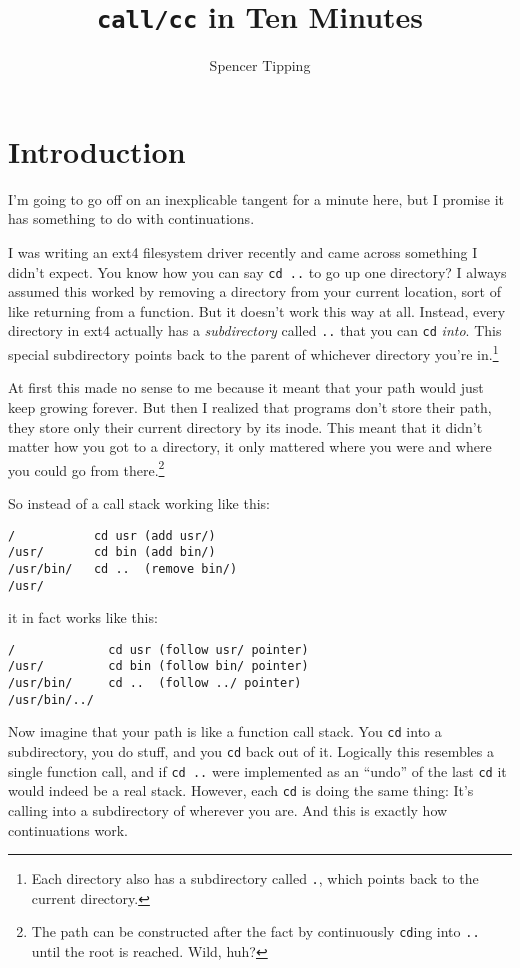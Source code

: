\documentclass{article}
\title{{\tt call/cc} in Ten Minutes}
\author{Spencer Tipping}
\begin{document}
\maketitle{}
\tableofcontents{}

\section{Introduction}
  I'm going to go off on an inexplicable tangent for a minute here, but I promise it has something to do with continuations.

  I was writing an ext4 filesystem driver recently and came across something I didn't expect. You know how you can say {\tt cd ..} to go up one directory? I always assumed this worked by
  removing a directory from your current location, sort of like returning from a function. But it doesn't work this way at all. Instead, every directory in ext4 actually has a {\em
  subdirectory} called {\tt ..} that you can {\tt cd} {\em into}. This special subdirectory points back to the parent of whichever directory you're in.\footnote{Each directory also has a
  subdirectory called {\tt .}, which points back to the current directory.}

  At first this made no sense to me because it meant that your path would just keep growing forever. But then I realized that programs don't store their path, they store only their current
  directory by its inode. This meant that it didn't matter how you got to a directory, it only mattered where you were and where you could go from there.\footnote{The path can be constructed
  after the fact by continuously {\tt cd}ing into {\tt ..} until the root is reached. Wild, huh?}

  So instead of a call stack working like this:

\begin{verbatim}
/           cd usr (add usr/)
/usr/       cd bin (add bin/)
/usr/bin/   cd ..  (remove bin/)
/usr/
\end{verbatim}

  \noindent it in fact works like this:

\begin{verbatim}
/             cd usr (follow usr/ pointer)
/usr/         cd bin (follow bin/ pointer)
/usr/bin/     cd ..  (follow ../ pointer)
/usr/bin/../
\end{verbatim}

  Now imagine that your path is like a function call stack. You {\tt cd} into a subdirectory, you do stuff, and you {\tt cd} back out of it. Logically this resembles a single function call,
  and if {\tt cd ..} were implemented as an ``undo'' of the last {\tt cd} it would indeed be a real stack. However, each {\tt cd} is doing the same thing: It's calling into a subdirectory of
  wherever you are. And this is exactly how continuations work.
\end{document}
